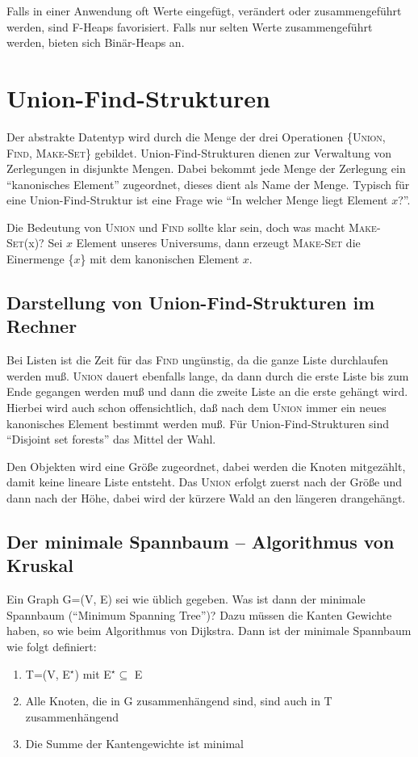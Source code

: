 \documentclass[ngerman,draft,parskip=half*,twoside]{scrreprt}
\theoremstyle{break}
\theoremstyle{nonumberbreak}
\begin{document}
Falls in einer Anwendung oft Werte eingefügt, verändert oder zusammengeführt werden, sind F-Heaps favorisiert. Falls
nur selten Werte zusammengeführt werden, bieten sich Binär-Heaps an. 

\chapter{Union-Find-Strukturen}
Der abstrakte Datentyp wird durch die Menge der drei Operationen \{\textsc{Union}, \textsc{Find}, \textsc{Make-Set}\}
gebildet. Union-Find-Strukturen dienen zur Verwaltung von Zerlegungen in disjunkte Mengen. Dabei bekommt jede Menge der
Zerlegung ein "`kanonisches Element"' zugeordnet, dieses dient als Name der Menge. Typisch für eine Union-Find-Struktur
ist eine Frage wie "`In welcher Menge liegt Element $x$?"'.

Die Bedeutung von \textsc{Union} und \textsc{Find} sollte klar sein, doch was macht \textsc{Make-Set}(x)?
Sei $x$ Element unseres Universums, dann erzeugt \textsc{Make-Set} die Einermenge \{$x$\} mit dem kanonischen Element 
$x$.
\section{Darstellung von Union-Find-Strukturen im Rechner}
Bei Listen ist die Zeit für das \textsc{Find} ungünstig, da die ganze Liste durchlaufen werden muß. \textsc{Union}
dauert ebenfalls lange, da dann durch die erste Liste bis zum Ende gegangen werden muß und dann die zweite Liste an die
erste gehängt wird. Hierbei wird auch schon offensichtlich, daß nach dem \textsc{Union} immer ein neues kanonisches
Element bestimmt werden muß. Für Union-Find-Strukturen sind "`Disjoint set forests"' das Mittel der Wahl.


Den Objekten wird eine Größe zugeordnet, dabei werden die Knoten mitgezählt, damit keine lineare Liste entsteht. Das
\textsc{Union} erfolgt zuerst nach der Größe und dann nach der Höhe, dabei wird der kürzere Wald an den längeren
drangehängt.

\section{Der minimale Spannbaum -- Algorithmus von Kruskal}
Ein Graph G=(V, E) sei wie üblich gegeben. Was ist dann der minimale Spannbaum ("`Minimum Spanning Tree"')?
Dazu müssen die Kanten Gewichte haben, so wie beim Algorithmus von Dijkstra. Dann ist der minimale Spannbaum wie folgt
definiert:
\begin{enumerate}
\item T=(V, E$^{\star}$) mit E$^{\star} \subseteq$ E
\item Alle Knoten, die in G zusammenhängend sind, sind auch in T zusammenhängend
\item Die Summe der Kantengewichte ist minimal
\end{enumerate}
\end{document}
